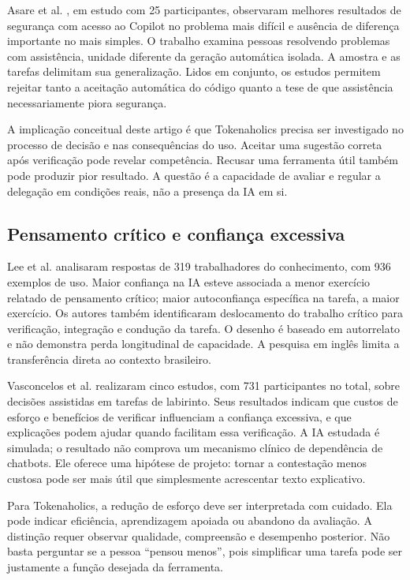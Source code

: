 \documentclass[11pt,a4paper]{article}
\begin{document}
Asare et al. \cite{asare}, em estudo com 25 participantes, observaram melhores resultados de segurança com acesso ao Copilot no problema mais difícil e ausência de diferença importante no mais simples. O trabalho examina pessoas resolvendo problemas com assistência, unidade diferente da geração automática isolada. A amostra e as tarefas delimitam sua generalização. Lidos em conjunto, os estudos permitem rejeitar tanto a aceitação automática do código quanto a tese de que assistência necessariamente piora segurança.

A implicação conceitual deste artigo é que Tokenaholics precisa ser investigado no processo de decisão e nas consequências do uso. Aceitar uma sugestão correta após verificação pode revelar competência. Recusar uma ferramenta útil também pode produzir pior resultado. A questão é a capacidade de avaliar e regular a delegação em condições reais, não a presença da IA em si.

\subsection{Pensamento crítico e confiança excessiva}
Lee et al. \cite{lee} analisaram respostas de 319 trabalhadores do conhecimento, com 936 exemplos de uso. Maior confiança na IA esteve associada a menor exercício relatado de pensamento crítico; maior autoconfiança específica na tarefa, a maior exercício. Os autores também identificaram deslocamento do trabalho crítico para verificação, integração e condução da tarefa. O desenho é baseado em autorrelato e não demonstra perda longitudinal de capacidade. A pesquisa em inglês limita a transferência direta ao contexto brasileiro.

Vasconcelos et al. \cite{vasconcelos} realizaram cinco estudos, com 731 participantes no total, sobre decisões assistidas em tarefas de labirinto. Seus resultados indicam que custos de esforço e benefícios de verificar influenciam a confiança excessiva, e que explicações podem ajudar quando facilitam essa verificação. A IA estudada é simulada; o resultado não comprova um mecanismo clínico de dependência de chatbots. Ele oferece uma hipótese de projeto: tornar a contestação menos custosa pode ser mais útil que simplesmente acrescentar texto explicativo.

Para Tokenaholics, a redução de esforço deve ser interpretada com cuidado. Ela pode indicar eficiência, aprendizagem apoiada ou abandono da avaliação. A distinção requer observar qualidade, compreensão e desempenho posterior. Não basta perguntar se a pessoa ``pensou menos'', pois simplificar uma tarefa pode ser justamente a função desejada da ferramenta.
\end{document}
